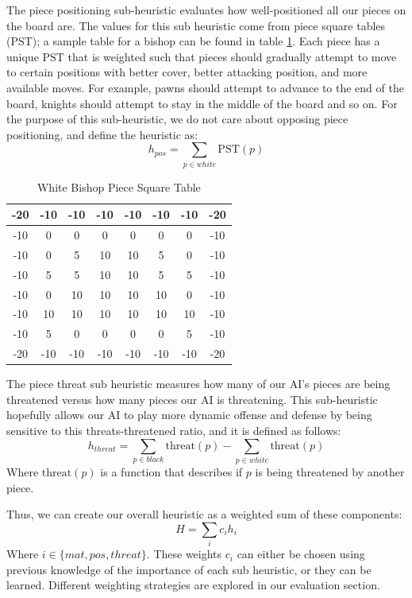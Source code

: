 \documentclass[letterpaper]{article}
\begin{document}
The piece positioning sub-heuristic evaluates how well-positioned all our pieces on the board are. The values for this sub heuristic come from piece square tables (PST); a sample table for a bishop can be found in table \ref{pst}. Each piece has a unique PST that is weighted such that pieces should gradually attempt to move to certain positions with better cover, better attacking position, and more available moves. For example, pawns should attempt to advance to the end of the board, knights should attempt to stay in the middle of the board and so on. For the purpose of this sub-heuristic, we do not care about opposing piece positioning, and define the heuristic as: 
$$
h_{pos} = \sum_{p \in white}\text{PST}(p)
$$
\begin{table}[]
    \centering
    \begin{tabular}{|c|c|c|c|c|c|c|c|} \hline
        -20&-10&-10&-10&-10&-10&-10&-20\\\hline
        -10&  0&  0&  0&  0&  0&  0&-10\\\hline
        -10&  0&  5& 10& 10&  5&  0&-10\\\hline
        -10&  5&  5& 10& 10&  5&  5&-10\\\hline
        -10&  0& 10& 10& 10& 10&  0&-10\\\hline
        -10& 10& 10& 10& 10& 10& 10&-10\\\hline
        -10&  5&  0&  0&  0&  0&  5&-10\\\hline
        -20&-10&-10&-10&-10&-10&-10&-20\\\hline
    \end{tabular}
    \caption{White Bishop Piece Square Table}
    \label{pst}
\end{table}
The piece threat sub heuristic measures how many of our AI's pieces are being threatened versus how many pieces our AI is threatening. This sub-heuristic hopefully allows our AI to play more dynamic offense and defense by being sensitive to this threats-threatened ratio, and it is defined as follows:
$$
h_{threat} = \sum_{p \in black}\text{threat}(p) - \sum_{p \in white}\text{threat}(p)
$$
Where $\text{threat}(p)$ is a function that describes if $p$ is being threatened by another piece.

Thus, we can create our overall heuristic as a weighted sum of these components:
$$
H = \sum_{i} c_ih_i
$$
Where $i \in \{mat,pos,threat\}$. These weights $c_i$ can either be chosen using previous knowledge of the importance of each sub heuristic, or they can be learned.  Different weighting strategies are explored in our evaluation section.
\end{document}
